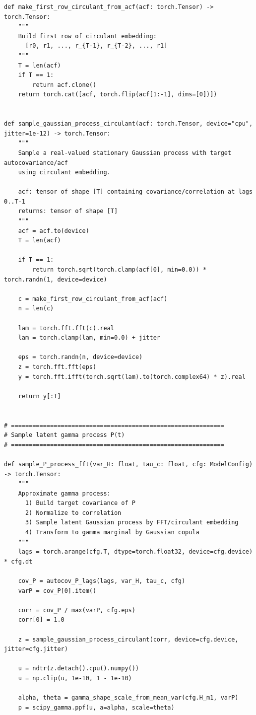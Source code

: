 \documentclass{article}
\begin{document}
\begin{verbatim}
def make_first_row_circulant_from_acf(acf: torch.Tensor) -> torch.Tensor:
    """
    Build first row of circulant embedding:
      [r0, r1, ..., r_{T-1}, r_{T-2}, ..., r1]
    """
    T = len(acf)
    if T == 1:
        return acf.clone()
    return torch.cat([acf, torch.flip(acf[1:-1], dims=[0])])


def sample_gaussian_process_circulant(acf: torch.Tensor, device="cpu", jitter=1e-12) -> torch.Tensor:
    """
    Sample a real-valued stationary Gaussian process with target autocovariance/acf
    using circulant embedding.

    acf: tensor of shape [T] containing covariance/correlation at lags 0..T-1
    returns: tensor of shape [T]
    """
    acf = acf.to(device)
    T = len(acf)

    if T == 1:
        return torch.sqrt(torch.clamp(acf[0], min=0.0)) * torch.randn(1, device=device)

    c = make_first_row_circulant_from_acf(acf)
    n = len(c)

    lam = torch.fft.fft(c).real
    lam = torch.clamp(lam, min=0.0) + jitter

    eps = torch.randn(n, device=device)
    z = torch.fft.fft(eps)
    y = torch.fft.ifft(torch.sqrt(lam).to(torch.complex64) * z).real

    return y[:T]


# ============================================================
# Sample latent gamma process P(t)
# ============================================================

def sample_P_process_fft(var_H: float, tau_c: float, cfg: ModelConfig) -> torch.Tensor:
    """
    Approximate gamma process:
      1) Build target covariance of P
      2) Normalize to correlation
      3) Sample latent Gaussian process by FFT/circulant embedding
      4) Transform to gamma marginal by Gaussian copula
    """
    lags = torch.arange(cfg.T, dtype=torch.float32, device=cfg.device) * cfg.dt

    cov_P = autocov_P_lags(lags, var_H, tau_c, cfg)
    varP = cov_P[0].item()

    corr = cov_P / max(varP, cfg.eps)
    corr[0] = 1.0

    z = sample_gaussian_process_circulant(corr, device=cfg.device, jitter=cfg.jitter)

    u = ndtr(z.detach().cpu().numpy())
    u = np.clip(u, 1e-10, 1 - 1e-10)

    alpha, theta = gamma_shape_scale_from_mean_var(cfg.H_m1, varP)
    p = scipy_gamma.ppf(u, a=alpha, scale=theta)


\end{verbatim}
\end{document}
